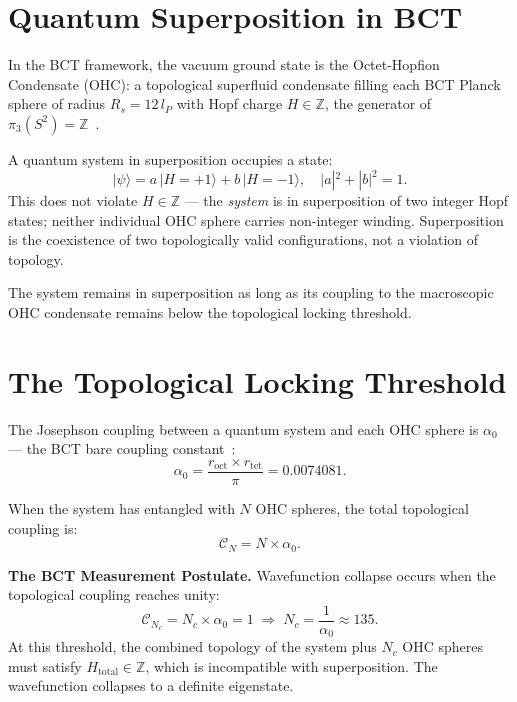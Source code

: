 \documentclass[aps,prl,twocolumn,superscriptaddress,showpacs]{revtex4-2}
\begin{document}
\section{Quantum Superposition in BCT}

In the BCT framework, the vacuum ground state is the Octet-Hopfion 
Condensate (OHC): a topological superfluid condensate filling each 
BCT Planck sphere of radius $R_s = 12\,l_P$ with Hopf charge 
$H \in \mathbb{Z}$, the generator of $\pi_3(S^2) = \mathbb{Z}$~\cite{BCT_AppJH}.

A quantum system in superposition occupies a state:
\begin{equation}
|\psi\rangle = a\,|H=+1\rangle + b\,|H=-1\rangle, \quad |a|^2 + |b|^2 = 1.
\end{equation}
This does not violate $H \in \mathbb{Z}$ --- the \emph{system} is in 
superposition of two integer Hopf states; neither individual OHC sphere 
carries non-integer winding. Superposition is the coexistence of two 
topologically valid configurations, not a violation of topology.

The system remains in superposition as long as its coupling to the 
macroscopic OHC condensate remains below the topological locking threshold.

\section{The Topological Locking Threshold}

The Josephson coupling between a quantum system and each OHC sphere 
is $\alpha_0$ --- the BCT bare coupling constant~\cite{BCT_AppJ}:
\begin{equation}
\alpha_0 = \frac{r_\mathrm{oct} \times r_\mathrm{tet}}{\pi} = 0.0074081.
\end{equation}

When the system has entangled with $N$ OHC spheres, the total 
topological coupling is:
\begin{equation}
\mathcal{C}_N = N \times \alpha_0.
\end{equation}

\textbf{The BCT Measurement Postulate.} Wavefunction collapse occurs 
when the topological coupling reaches unity:
\begin{equation}
\boxed{\mathcal{C}_{N_c} = N_c \times \alpha_0 = 1 \;\Rightarrow\; 
N_c = \frac{1}{\alpha_0} \approx 135.}
\end{equation}
At this threshold, the combined topology of the system plus $N_c$ OHC 
spheres must satisfy $H_\mathrm{total} \in \mathbb{Z}$, which is 
incompatible with superposition. The wavefunction collapses to a 
definite eigenstate.
\end{document}

